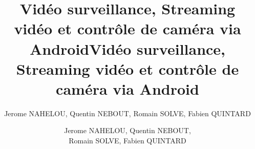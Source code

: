 \documentclass[a4paper,10pt]{report}
\title{Vidéo surveillance, Streaming vidéo et contrôle de caméra via
Android}
\author{Jerome NAHELOU, Quentin NEBOUT, Romain SOLVE, Fabien QUINTARD}
\begin{document}
\title{Vidéo surveillance, Streaming vidéo et contrôle de caméra via
Android}
\author{Jerome NAHELOU, Quentin NEBOUT,\\ Romain SOLVE, Fabien QUINTARD}
\renewcommand{\today}{Universitée Bordeaux 1, Talence}
\maketitle
\tableofcontents \clearpage




\end{document}
